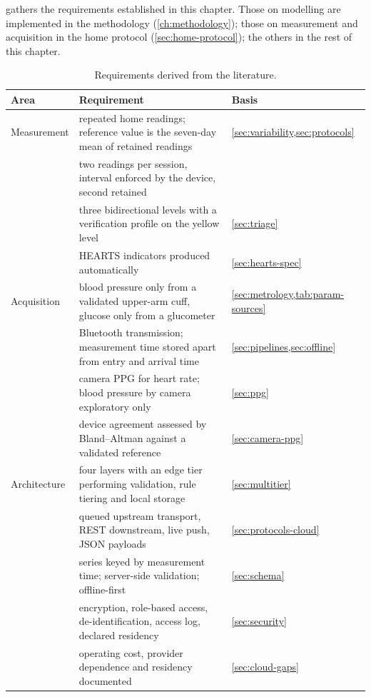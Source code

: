  gathers the requirements established in this chapter. Those on modelling are implemented in the methodology (\cref{ch:methodology}); those on measurement and acquisition in the home protocol (\cref{sec:home-protocol}); the others in the rest of this chapter.

\begin{table}[htbp]
\centering\footnotesize
\caption{Requirements derived from the literature.}\label{tab:requirements}
\begin{tabularx}{\textwidth}{@{}>{\raggedright\arraybackslash}p{2.2cm} X >{\raggedright\arraybackslash}p{3.5cm}@{}}
\toprule
\textbf{Area} & \textbf{Requirement} & \textbf{Basis} \\
\midrule
Measurement & repeated home readings; reference value is the seven-day mean of retained readings & \cref{sec:variability,sec:protocols} \\
 & two readings per session, interval enforced by the device, second retained & \textcite{mihevc2025} \\
 & three bidirectional levels with a verification profile on the yellow level & \cref{sec:triage} \\
 & HEARTS indicators produced automatically & \cref{sec:hearts-spec} \\
\addlinespace
Acquisition & blood pressure only from a validated upper-arm cuff, glucose only from a glucometer & \cref{sec:metrology,tab:param-sources} \\
 & Bluetooth transmission; measurement time stored apart from entry and arrival time & \cref{sec:pipelines,sec:offline} \\
 & camera PPG for heart rate; blood pressure by camera exploratory only & \cref{sec:ppg} \\
 & device agreement assessed by Bland--Altman against a validated reference & \cref{sec:camera-ppg} \\
\addlinespace
Architecture & four layers with an edge tier performing validation, rule tiering and local storage & \cref{sec:multitier} \\
 & queued upstream transport, REST downstream, live push, JSON payloads & \cref{sec:protocols-cloud} \\
 & series keyed by measurement time; server-side validation; offline-first & \cref{sec:schema} \\
 & encryption, role-based access, de-identification, access log, declared residency & \cref{sec:security} \\
 & operating cost, provider dependence and residency documented & \cref{sec:cloud-gaps} \\

\end{tabularx}
\end{table}
